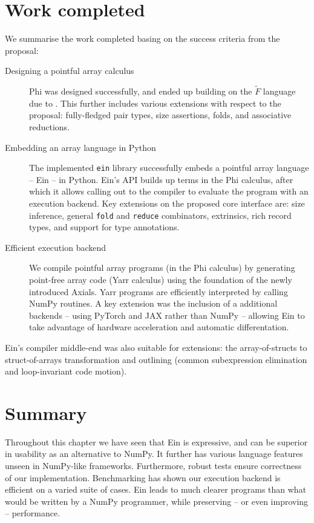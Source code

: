 \section{Work completed}
\label{work-completed}

We summarise the work completed basing on the success criteria from the proposal: \begin{description}
    \item[Designing a pointful array calculus] Phi was designed successfully, and ended up building on the $\tilde F$ language due to \textcite{shaikhha2019efficient}. This further includes various extensions with respect to the proposal: fully-fledged pair types, size assertions, folds, and associative reductions.
    \item[Embedding an array language in Python] The implemented \texttt{ein} library successfully embeds a pointful array language -- Ein -- in Python. Ein's API builds up terms in the Phi calculus, after which it allows calling out to the compiler to evaluate the program with an execution backend. Key extensions on the proposed core interface are: size inference, general \texttt{fold} and \texttt{reduce} combinators, extrinsics, rich record types, and support for type annotations.
    \item[Efficient execution backend] We compile pointful array programs (in the Phi calculus) by generating point-free array code (Yarr calculus) using the foundation of the newly introduced Axials. Yarr programs are efficiently interpreted by calling NumPy routines. A key extension was the inclusion of a additional backends -- using PyTorch and JAX rather than NumPy -- allowing Ein to take advantage of hardware acceleration and automatic differentation.
\end{description}
Ein's compiler middle-end was also suitable for extensions: the array-of-structs to struct-of-arrays transformation and outlining (common subexpression elimination and loop-invariant code motion).


\needspace{2em}
\section{Summary}

Throughout this chapter we have seen that Ein is expressive, and can be superior in usability as an alternative to NumPy. 
It further has various language features unseen in NumPy-like frameworks.
Furthermore, robust tests ensure correctness of our implementation. 
Benchmarking has shown our execution backend is efficient on a varied suite of cases. 
Ein leads to much clearer programs than what would be written by a NumPy programmer, while preserving -- or even improving -- performance. 
